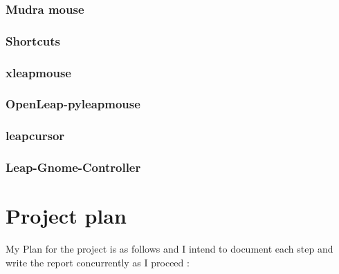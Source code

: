 \documentclass[a4paper]{article}
\begin{document}
\subsubsection{Mudra mouse}
\subsubsection{Shortcuts}
\subsubsection{xleapmouse}
\subsubsection{OpenLeap-pyleapmouse}
\subsubsection{leapcursor}
\subsubsection{Leap-Gnome-Controller}
\newpage
\section{Project plan}
My Plan for the project is as follows and I intend to document each step and write the report concurrently as I proceed :
\end{document}
